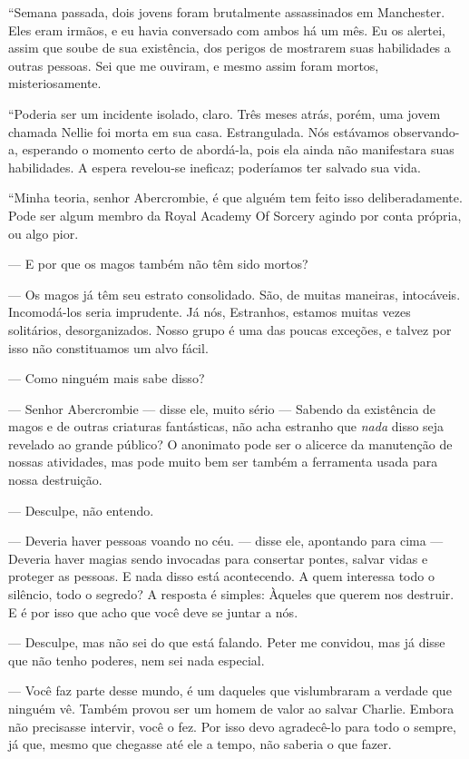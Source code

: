 “Semana passada, dois jovens foram brutalmente assassinados em Manchester. Eles
eram irmãos, e eu havia conversado com ambos há um mês. Eu os alertei, assim
que soube de sua existência, dos perigos de mostrarem suas habilidades a outras
pessoas. Sei que me ouviram, e mesmo assim foram mortos, misteriosamente.

“Poderia ser um incidente isolado, claro. Três meses atrás, porém, uma jovem
chamada Nellie foi morta em sua casa. Estrangulada. Nós estávamos observando-a,
esperando o momento certo de abordá-la, pois ela ainda não manifestara suas
habilidades. A espera revelou-se ineficaz; poderíamos ter salvado sua vida.

“Minha teoria, senhor Abercrombie, é que alguém tem feito isso deliberadamente.
Pode ser algum membro da Royal Academy Of Sorcery agindo por conta própria, ou
algo pior.

--- E por que os magos também não têm sido mortos?

--- Os magos já têm seu estrato consolidado. São, de muitas maneiras,
intocáveis. Incomodá-los seria imprudente. Já nós, Estranhos, estamos muitas
vezes solitários, desorganizados. Nosso grupo é uma das poucas exceções, e
talvez por isso não constituamos um alvo fácil.

--- Como ninguém mais sabe disso?

--- Senhor Abercrombie --- disse ele, muito sério --- Sabendo da
existência de magos e de outras criaturas fantásticas, não acha estranho
que \emph{nada} disso seja revelado ao grande público? O anonimato pode
ser o alicerce da manutenção de nossas atividades, mas pode muito bem
ser também a ferramenta usada para nossa destruição.

--- Desculpe, não entendo.

--- Deveria haver pessoas voando no céu. --- disse ele, apontando para cima ---
Deveria haver magias sendo invocadas para consertar pontes, salvar vidas e
proteger as pessoas. E nada disso está acontecendo. A quem interessa todo o
silêncio, todo o segredo? A resposta é simples: Àqueles que querem nos
destruir. E é por isso que acho que você deve se juntar a nós.

--- Desculpe, mas não sei do que está falando. Peter me convidou, mas já disse
que não tenho poderes, nem sei nada especial.

--- Você faz parte desse mundo, é um daqueles que vislumbraram a verdade que
ninguém vê. Também provou ser um homem de valor ao salvar Charlie. Embora não
precisasse intervir, você o fez. Por isso devo agradecê-lo para todo o sempre,
já que, mesmo que chegasse até ele a tempo, não saberia o que fazer.

